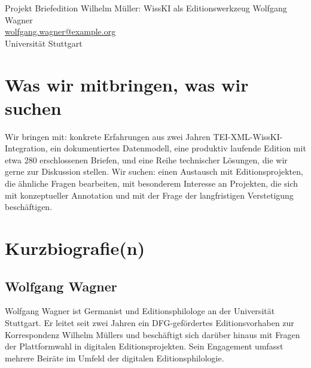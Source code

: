 \begin{beitrag}{Projekt \glqq Briefedition Wilhelm Müller\grqq{}: WissKI als Editionswerkzeug}{%
Wolfgang Wagner\, \\
\small \href{mailto:wolfgang.wagner@example.org}{wolfgang.wagner@example.org} \\
\small Universität Stuttgart
}
\section{Was wir mitbringen, was wir suchen}
Wir bringen mit: konkrete Erfahrungen aus zwei Jahren TEI-XML-WissKI-Integration, ein dokumentiertes Datenmodell, eine produktiv laufende Edition mit etwa 280 erschlossenen Briefen, und eine Reihe technischer Lösungen, die wir gerne zur Diskussion stellen. Wir suchen: einen Austausch mit Editionsprojekten, die ähnliche Fragen bearbeiten, mit besonderem Interesse an Projekten, die sich mit konzeptueller Annotation und mit der Frage der langfristigen Verstetigung beschäftigen.

\end{beitrag}

\section*{Kurzbiografie(n)}

\subsection*{Wolfgang Wagner}
Wolfgang Wagner ist Germanist und Editionsphilologe an der Universität Stuttgart. Er leitet seit zwei Jahren ein DFG-gefördertes Editionsvorhaben zur Korrespondenz Wilhelm Müllers und beschäftigt sich darüber hinaus mit Fragen der Plattformwahl in digitalen Editionsprojekten. Sein Engagement umfasst mehrere Beiräte im Umfeld der digitalen Editionsphilologie.
